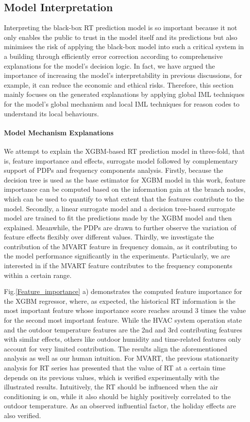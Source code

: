 \documentclass[11pt]{article}
\begin{document}
    \subsection{Model Interpretation}
    
    Interpreting the black-box RT prediction model is so important because it not only enables the public to trust in the model itself and its predictions but also minimises the risk of applying the black-box model into such a critical system in a building through efficiently error correction according to comprehensive explanations for the model’s decision logic. In fact, we have argued the importance of increasing the model’s interpretability in previous discussions, for example, it can reduce the economic and ethical risks. Therefore, this section mainly focuses on the generated explanations by applying global IML techniques for the model’s global mechanism and local IML techniques for reason codes to understand its local behaviours.
    
    \paragraph{Model Mechanism Explanations}
    We attempt to explain the XGBM-based RT prediction model in three-fold, that is, feature importance and effects, surrogate model followed by complementary support of PDPs and frequency components analysis. Firstly, because the decision tree is used as the base estimator for XGBM model in this work, feature importance can be computed based on the information gain at the branch nodes, which can be used to quantify to what extent that the features contribute to the model. Secondly, a linear surrogate model and a decision tree-based surrogate model are trained to fit the predictions made by the XGBM model and then explained. Meanwhile, the PDPs are drawn to further observe the variation of feature effects flexibly over different values. Thirdly, we investigate the contribution of the MVART feature in frequency domain, as it contributing to the model performance significantly in the experiments. Particularly, we are interested in if the MVART feature contributes to the frequency components within a certain range.
    
    Fig.\ref{Feature_importance} a) demonstrates the computed feature importance for the XGBM regressor, where, as expected, the historical RT information is the most important feature whose importance score reaches around 3 times the value for the second most important feature. While the HVAC system operation state and the outdoor temperature features are the 2nd and 3rd contributing features with similar effects, others like outdoor humidity and time-related features only account for very limited contribution. The results align the aforementioned analysis as well as our human intuition. For MVART, the previous stationarity analysis for RT series has presented that the value of RT at a certain time depends on its previous values, which is verified experimentally with the illustrated results. Intuitively, the RT should be influenced when the air conditioning is on, while it also should be highly positively correlated to the outdoor temperature. As an observed influential factor, the holiday effects are also verified.
    
\end{document}
